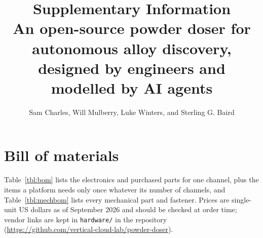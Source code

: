 \documentclass[10pt]{article}
\title{Supplementary Information\\[2mm]
\large An open-source powder doser for autonomous alloy discovery, designed by
engineers and modelled by AI agents}
\author{Sam Charles, Will Mulberry, Luke Winters, and Sterling G. Baird}
\date{}
\begin{document}
\maketitle

\section{Bill of materials}
\label{sec:bom}

Table~\ref{tbl:bom} lists the electronics and purchased parts for one channel, plus the items a platform
needs only once whatever its number of channels, and Table~\ref{tbl:mechbom} lists every mechanical part and fastener. Prices are single-unit US
dollars as of September 2026 and should be checked at order time; vendor links
are kept in \texttt{hardware/} in the repository
(\url{https://github.com/vertical-cloud-lab/powder-doser}).
\end{document}
